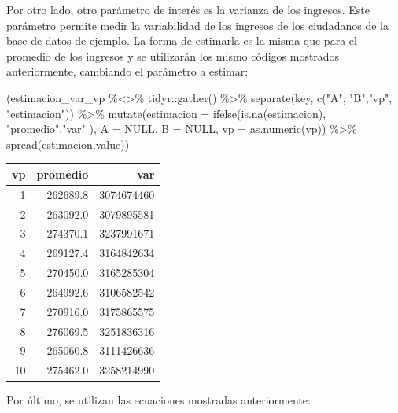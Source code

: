 \documentclass[
  12pt,
]{book}
\newenvironment{Shaded}{\begin{snugshade}}{\end{snugshade}}
\newcommand{\AttributeTok}[1]{\textcolor[rgb]{0.77,0.63,0.00}{#1}}
\newcommand{\ConstantTok}[1]{\textcolor[rgb]{0.00,0.00,0.00}{#1}}
\newcommand{\FunctionTok}[1]{\textcolor[rgb]{0.00,0.00,0.00}{#1}}
\newcommand{\NormalTok}[1]{#1}
\newcommand{\SpecialCharTok}[1]{\textcolor[rgb]{0.00,0.00,0.00}{#1}}
\newcommand{\StringTok}[1]{\textcolor[rgb]{0.31,0.60,0.02}{#1}}
\begin{document}
Por otro lado, otro parámetro de interés es la varianza de los ingresos. Este parámetro permite medir la variabilidad de los ingresos de los ciudadanos de la base de datos de ejemplo. La forma de estimarla es la misma que para el promedio de los ingresos y se utilizarán los mismo códigos mostrados anteriormente, cambiando el parámetro a estimar:

\begin{Shaded}
\begin{Highlighting}[]
\NormalTok{(estimacion\_var\_vp }\SpecialCharTok{\%\textless{}\textgreater{}\%}\NormalTok{ tidyr}\SpecialCharTok{::}\FunctionTok{gather}\NormalTok{() }\SpecialCharTok{\%\textgreater{}\%}
   \FunctionTok{separate}\NormalTok{(key, }\FunctionTok{c}\NormalTok{(}\StringTok{"A"}\NormalTok{, }\StringTok{"B"}\NormalTok{,}\StringTok{"vp"}\NormalTok{, }\StringTok{"estimacion"}\NormalTok{)) }\SpecialCharTok{\%\textgreater{}\%} 
\FunctionTok{mutate}\NormalTok{(}\AttributeTok{estimacion =} \FunctionTok{ifelse}\NormalTok{(}\FunctionTok{is.na}\NormalTok{(estimacion), }\StringTok{"promedio"}\NormalTok{,}\StringTok{"var"}\NormalTok{ ),}
       \AttributeTok{A =} \ConstantTok{NULL}\NormalTok{, }\AttributeTok{B =} \ConstantTok{NULL}\NormalTok{, }\AttributeTok{vp =} \FunctionTok{as.numeric}\NormalTok{(vp)) }\SpecialCharTok{\%\textgreater{}\%} 
  \FunctionTok{spread}\NormalTok{(estimacion,value))}
\end{Highlighting}
\end{Shaded}

\begin{tabular}{r|r|r}
\hline
vp & promedio & var\\
\hline
1 & 262689.8 & 3074674460\\
\hline
2 & 263092.0 & 3079895581\\
\hline
3 & 274370.1 & 3237991671\\
\hline
4 & 269127.4 & 3164842634\\
\hline
5 & 270450.0 & 3165285304\\
\hline
6 & 264992.6 & 3106582542\\
\hline
7 & 270916.0 & 3175865575\\
\hline
8 & 276069.5 & 3251836316\\
\hline
9 & 265060.8 & 3111426636\\
\hline
10 & 275462.0 & 3258214990\\
\hline
\end{tabular}

Por último, se utilizan las ecuaciones mostradas anteriormente:
\end{document}
